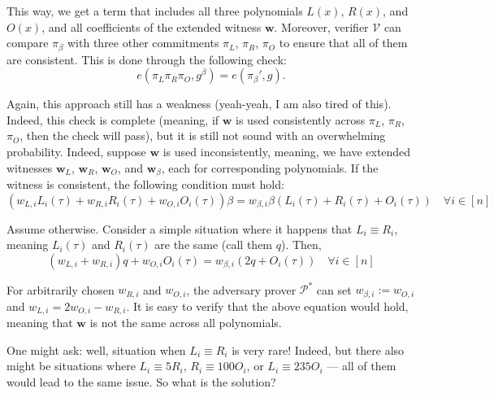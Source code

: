 \documentclass[../lecture-notes.tex]{subfiles}
\begin{document}
This way, we get a term that includes all three polynomials $L(x)$, $R(x)$, and $O(x)$, and all coefficients of the extended witness $\mathbf{w}$. Moreover, verifier $\mathcal{V}$ can compare $\pi_{\beta}$ with three other commitments $\pi_L$, $\pi_R$, $\pi_O$ to ensure that all of them are consistent. This is done through the following check:
\begin{equation*}
    e(\pi_L\pi_R\pi_O, g^{\beta}) = e(\pi_{\beta}', g).
\end{equation*}

Again, this approach still has a weakness (yeah-yeah, I am also tired of this). Indeed, this check is complete (meaning, if $\mathbf{w}$ is used consistently across $\pi_L$, $\pi_R$, $\pi_O$, then the check will pass), but it is still not sound with an overwhelming probability. Indeed, suppose $\mathbf{w}$ is used inconsistently, meaning, we have extended witnesses $\mathbf{w}_L$, $\mathbf{w}_R$, $\mathbf{w}_O$, and $\mathbf{w}_{\beta}$, each for corresponding polynomials. If the witness is consistent, the following condition must hold:
\begin{equation*}
    (w_{L,i}L_i(\tau) + w_{R,i}R_i(\tau) + w_{O,i}O_i(\tau))\beta = w_{\beta,i}\beta(L_i(\tau) + R_i(\tau) + O_i(\tau)) \quad \forall i \in [n]
\end{equation*}

Assume otherwise. Consider a simple situation where it happens that $L_i \equiv R_i$, meaning $L_i(\tau)$ and $R_i(\tau)$ are the same (call them $q$). Then,
\begin{equation*}
    (w_{L,i} + w_{R,i})q + w_{O,i}O_i(\tau)= w_{\beta,i}(2q + O_i(\tau)) \quad \forall i \in [n]
\end{equation*}

For arbitrarily chosen $w_{R,i}$ and $w_{O,i}$, the adversary prover $\mathcal{P}^*$ can set $w_{\beta,i} := w_{O,i}$ and $w_{L,i}=2w_{O,i} - w_{R,i}$. It is easy to verify that the above equation would hold, meaning that $\mathbf{w}$ is not the same across all polynomials. 

One might ask: well, situation when $L_i \equiv R_i$ is very rare! Indeed, but there also might be situations where $L_i \equiv 5R_i$, $R_i \equiv 100O_i$, or $L_i \equiv 235O_i$ --- all of them would lead to the same issue. So what is the solution? 
\end{document}
